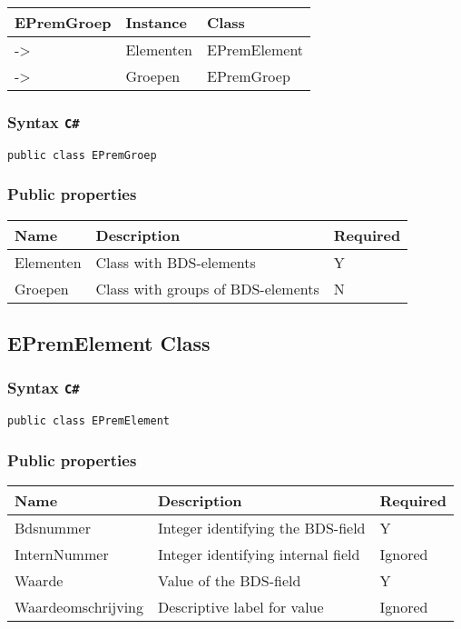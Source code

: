 \documentclass[]{book}
\begin{document}
\begin{longtable}[]{@{}lll@{}}
\toprule
EPremGroep & Instance & Class\tabularnewline
\midrule
\endhead
-\textgreater{} & Elementen & EPremElement\tabularnewline
-\textgreater{} & Groepen & EPremGroep\tabularnewline
\bottomrule
\end{longtable}

\hypertarget{syntax-c-1}{%
\subsubsection{\texorpdfstring{Syntax \texttt{C\#}}{Syntax C\#}}\label{syntax-c-1}}

\texttt{public\ class\ EPremGroep}

\hypertarget{public-properties-1}{%
\subsubsection{Public properties}\label{public-properties-1}}

\begin{longtable}[]{@{}lll@{}}
\toprule
Name & Description & Required\tabularnewline
\midrule
\endhead
Elementen & Class with BDS-elements & Y\tabularnewline
Groepen & Class with groups of BDS-elements & N\tabularnewline
\bottomrule
\end{longtable}

\hypertarget{epremelement-class}{%
\subsection{EPremElement Class}\label{epremelement-class}}

\hypertarget{syntax-c-2}{%
\subsubsection{\texorpdfstring{Syntax \texttt{C\#}}{Syntax C\#}}\label{syntax-c-2}}

\texttt{public\ class\ EPremElement}

\hypertarget{public-properties-2}{%
\subsubsection{Public properties}\label{public-properties-2}}

\begin{longtable}[]{@{}lll@{}}
\toprule
Name & Description & Required\tabularnewline
\midrule
\endhead
Bdsnummer & Integer identifying the BDS-field & Y\tabularnewline
InternNummer & Integer identifying internal field & Ignored\tabularnewline
Waarde & Value of the BDS-field & Y\tabularnewline
Waardeomschrijving & Descriptive label for value & Ignored\tabularnewline
\bottomrule
\end{longtable}
\end{document}
